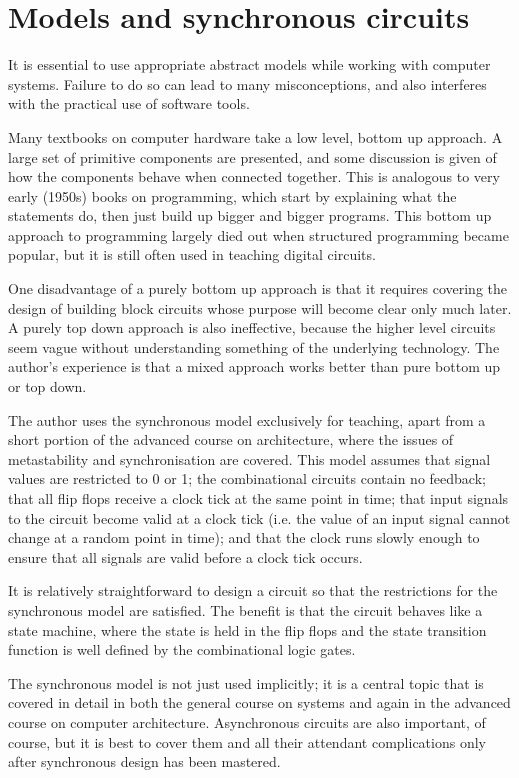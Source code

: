 \documentclass[submission,copyright,creativecommons]{eptcs}
\begin{document}
\section{Models and synchronous circuits}
\label{sec:models}

It is essential to use appropriate abstract models while working with
computer systems.  Failure to do so can lead to many misconceptions,
and also interferes with the practical use of software tools.

Many textbooks on computer hardware take a low level, bottom up
approach.  A large set of primitive components are presented, and some
discussion is given of how the components behave when connected
together.  This is analogous to very early (1950s) books on
programming, which start by explaining what the statements do, then
just build up bigger and bigger programs.  This bottom up approach to
programming largely died out when structured programming became
popular, but it is still often used in teaching digital circuits.

One disadvantage of a purely bottom up approach is that it requires
covering the design of building block circuits whose purpose will
become clear only much later.  A purely top down approach is also
ineffective, because the higher level circuits seem vague without
understanding something of the underlying technology.  The author's
experience is that a mixed approach works better than pure bottom up
or top down.

The author uses the synchronous model exclusively for teaching, apart
from a short portion of the advanced course on architecture, where the
issues of metastability and synchronisation are covered.  This model
assumes that signal values are restricted to 0 or 1; the combinational
circuits contain no feedback; that all flip flops receive a clock tick
at the same point in time; that input signals to the circuit become
valid at a clock tick (i.e. the value of an input signal cannot change
at a random point in time); and that the clock runs slowly enough to
ensure that all signals are valid before a clock tick occurs.

It is relatively straightforward to design a circuit so that the
restrictions for the synchronous model are satisfied.  The benefit is
that the circuit behaves like a state machine, where the state is held
in the flip flops and the state transition function is well defined by
the combinational logic gates.

The synchronous model is not just used implicitly; it is a central
topic that is covered in detail in both the general course on systems
and again in the advanced course on computer architecture.
Asynchronous circuits are also important, of course, but it is best to
cover them and all their attendant complications only after
synchronous design has been mastered.
\end{document}
